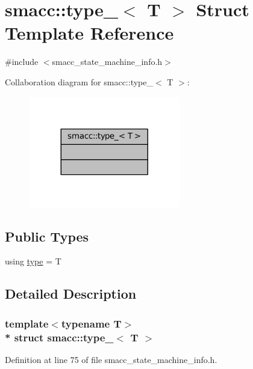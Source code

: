 \hypertarget{structsmacc_1_1type__}{}\section{smacc\+:\+:type\+\_\+$<$ T $>$ Struct Template Reference}
\label{structsmacc_1_1type__}


{\ttfamily \#include $<$smacc\+\_\+state\+\_\+machine\+\_\+info.\+h$>$}



Collaboration diagram for smacc\+:\+:type\+\_\+$<$ T $>$\+:
\nopagebreak
\begin{figure}[H]
\begin{center}
\leavevmode
\includegraphics[width=188pt]{structsmacc_1_1type____coll__graph}
\end{center}
\end{figure}
\subsection*{Public Types}
\begin{DoxyCompactItemize}
\item 
using \hyperlink{structsmacc_1_1type___a9b8fcdd94d0e9fc71366e867a4094463}{type} = T
\end{DoxyCompactItemize}


\subsection{Detailed Description}
\subsubsection*{template$<$typename T$>$\\*
struct smacc\+::type\+\_\+$<$ T $>$}



Definition at line 75 of file smacc\+\_\+state\+\_\+machine\+\_\+info.\+h.



